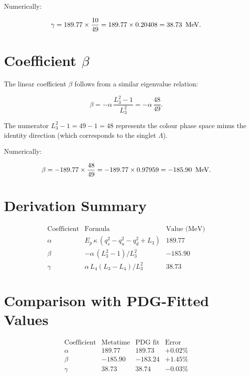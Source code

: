 Numerically:

\[
\gamma = 189.77 \times \frac{10}{49}
       = 189.77 \times 0.20408
       = 38.73\ \,\text{MeV}.
\]

\section{Coefficient \(\beta\)}

The linear coefficient \(\beta\) follows from a similar eigenvalue
relation:

\begin{equation}
\beta = -\alpha\,\frac{L_3^2 - 1}{L_3^2}
       = -\alpha\,\frac{48}{49}.
\label{eq:beta}
\end{equation}

The numerator \(L_3^2 - 1 = 49 - 1 = 48\) represents the colour
phase space minus the identity direction (which corresponds to the
singlet \(\Lambda\)).

Numerically:

\[
\beta = -189.77 \times \frac{48}{49}
       = -189.77 \times 0.97959
       = -185.90\ \,\text{MeV}.
\]

\section{Derivation Summary}

\[
\begin{array}{cclc}
\text{Coefficient} & \text{Formula} & \text{Value (MeV)} \\
\hline
\alpha & E_p\,\kappa\,(q_s^2 - q_u^2 - q_d^2 + L_3) & 189.77 \\
\beta   & -\alpha\,(L_3^2 - 1)/L_3^2 & -185.90 \\
\gamma  & \alpha\,L_4(L_3 - L_4)/L_3^2 & 38.73
\end{array}
\]

\section{Comparison with PDG-Fitted Values}

\[
\begin{array}{lccc}
\text{Coefficient} & \text{Metatime} & \text{PDG fit} & \text{Error} \\
\hline
\alpha & 189.77 & 189.73 & +0.02\% \\
\beta   & -185.90 & -183.24 & +1.45\% \\
\gamma  & 38.73 & 38.74 & -0.03\% \\
\end{array}
\]

